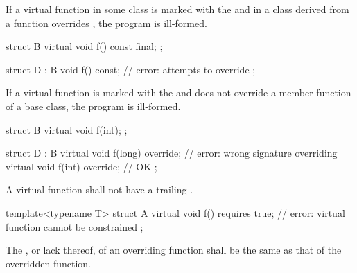 \pnum
If a virtual function  in some class  is marked with the
  and in a class  derived from 
a function  overrides , the program is ill-formed.
\begin{example}
\begin{codeblock}
struct B {
  virtual void f() const final;
};

struct D : B {
  void f() const;   // error:  attempts to override  
};
\end{codeblock}
\end{example}

\pnum
If a virtual function is marked with the   and
does not override a member function of a base class, the program is ill-formed.
\begin{example}
\begin{codeblock}
struct B {
  virtual void f(int);
};

struct D : B {
  virtual void f(long) override;        // error: wrong signature overriding 
  virtual void f(int) override;         // OK
};
\end{codeblock}
\end{example}

\pnum
A virtual function shall not have a trailing .
\begin{example}
\begin{codeblock}
template<typename T>
struct A {
  virtual void f() requires true;       // error: virtual function cannot be constrained
};
\end{codeblock}
\end{example}

\pnum
The , or lack thereof, of an overriding function
shall be the same as that of the overridden function.

